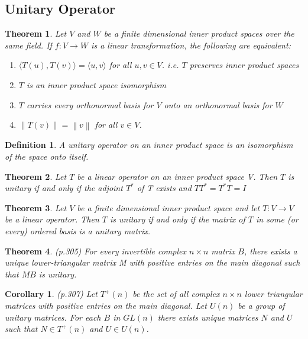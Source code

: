 \documentclass{article}
\newcommand{\norm}[1]{\left\lVert#1\right\rVert}
\newcommand{\innerproduct}[1]{\langle#1\rangle}
\newtheorem{theorem}{Theorem}[section]
\newtheorem{definition}{Definition}[section]
\newtheorem{corollary}{Corollary}[theorem]
\numberwithin{theorem}{subsection} %
\numberwithin{definition}{subsection} %
\begin{document}
\subsection{Unitary Operator}

\begin{theorem}
    Let $V$ and $W$ be a finite dimensional inner product spaces over the same field.  If
    $f : V \rightarrow W$ is a linear transformation, the following are equivalent:

    \begin{enumerate}
        \item $\innerproduct{T(u),T(v)} = \innerproduct{u,v}$ for all $u,v \in V$. i.e. $T$ preserves inner product spaces
        \item $T$ is an inner product space isomorphism
        \item $T$ carries every orthonormal basis for $V$ onto an orthonormal basis for $W$
        \item $\norm{T(v)}=\norm{v}$ for all $v \in V$.
    \end{enumerate}
\end{theorem}

\begin{definition}
    A unitary operator on an inner product space is an isomorphism of the space onto
    itself.
\end{definition}

\begin{theorem}
    Let $T$ be a linear operator on an inner product space V. Then $T$ is unitary if and
    only if the adjoint $T^*$ of  T exists and $TT^*=T^*T = I$
\end{theorem}

\begin{theorem}
    Let $V$ be a finite dimensional inner product space and let $T: V \rightarrow V$ be
    a linear operator. Then $T$ is unitary if and only if the matrix of $T$ in some (or every) ordered basis is
a unitary matrix. 
\end{theorem}

\begin{theorem}
    (p.305)
    For every invertible complex $n \times n$ matrix $B$, there exists a unique lower-triangular
    matrix M with positive entries on the main diagonal such that $MB$ is unitary.
\end{theorem}

\begin{corollary}
    (p.307)
    Let $T^+(n)$ be the set of all complex $n \times n$ lower triangular matrices with
    positive entries on the main diagonal. Let $U(n)$ be a group of unitary matrices. For each $B$ in $GL(n)$ there exists unique matrices $N$ and $U$ such that $N \in
    T^+(n)$ and $U \in U(n)$.
\end{corollary}
\end{document}
